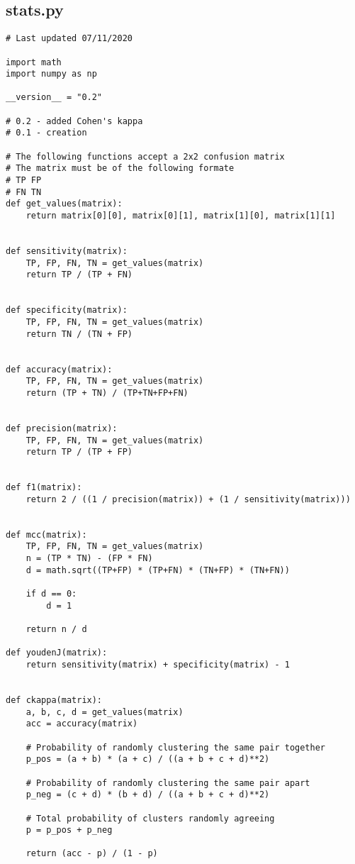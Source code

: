 \documentclass[11pt, a4paper]{article}
\begin{document}
\subsection{stats.py}
\begin{verbatim}
# Last updated 07/11/2020

import math
import numpy as np

__version__ = "0.2"

# 0.2 - added Cohen's kappa
# 0.1 - creation

# The following functions accept a 2x2 confusion matrix
# The matrix must be of the following formate
# TP FP
# FN TN
def get_values(matrix):
    return matrix[0][0], matrix[0][1], matrix[1][0], matrix[1][1]


def sensitivity(matrix):
    TP, FP, FN, TN = get_values(matrix)
    return TP / (TP + FN)


def specificity(matrix):
    TP, FP, FN, TN = get_values(matrix)
    return TN / (TN + FP)


def accuracy(matrix):
    TP, FP, FN, TN = get_values(matrix)
    return (TP + TN) / (TP+TN+FP+FN)


def precision(matrix):
    TP, FP, FN, TN = get_values(matrix)
    return TP / (TP + FP)


def f1(matrix):
    return 2 / ((1 / precision(matrix)) + (1 / sensitivity(matrix)))


def mcc(matrix):
    TP, FP, FN, TN = get_values(matrix)
    n = (TP * TN) - (FP * FN)
    d = math.sqrt((TP+FP) * (TP+FN) * (TN+FP) * (TN+FN))
    
    if d == 0:
        d = 1
    
    return n / d

def youdenJ(matrix):
    return sensitivity(matrix) + specificity(matrix) - 1


def ckappa(matrix):
    a, b, c, d = get_values(matrix)
    acc = accuracy(matrix)
    
    # Probability of randomly clustering the same pair together
    p_pos = (a + b) * (a + c) / ((a + b + c + d)**2) 
    
    # Probability of randomly clustering the same pair apart
    p_neg = (c + d) * (b + d) / ((a + b + c + d)**2)
    
    # Total probability of clusters randomly agreeing
    p = p_pos + p_neg
    
    return (acc - p) / (1 - p)
\end{verbatim}
\end{document}
